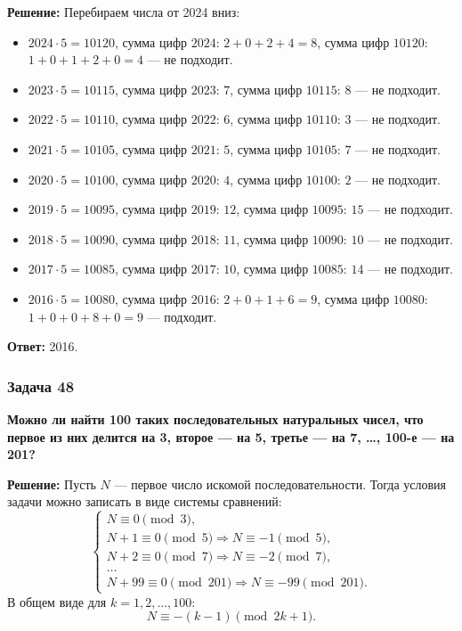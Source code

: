 \documentclass[12pt, a4paper]{article}
\begin{document}
\textbf{Решение:}
Перебираем числа от 2024 вниз:
\begin{itemize}
    \item $2024 \cdot 5 = 10120$, сумма цифр $2024$: $2+0+2+4=8$, сумма цифр $10120$: $1+0+1+2+0=4$ — не подходит.
    \item $2023 \cdot 5 = 10115$, сумма цифр $2023$: $7$, сумма цифр $10115$: $8$ — не подходит.
    \item $2022 \cdot 5 = 10110$, сумма цифр $2022$: $6$, сумма цифр $10110$: $3$ — не подходит.
    \item $2021 \cdot 5 = 10105$, сумма цифр $2021$: $5$, сумма цифр $10105$: $7$ — не подходит.
    \item $2020 \cdot 5 = 10100$, сумма цифр $2020$: $4$, сумма цифр $10100$: $2$ — не подходит.
    \item $2019 \cdot 5 = 10095$, сумма цифр $2019$: $12$, сумма цифр $10095$: $15$ — не подходит.
    \item $2018 \cdot 5 = 10090$, сумма цифр $2018$: $11$, сумма цифр $10090$: $10$ — не подходит.
    \item $2017 \cdot 5 = 10085$, сумма цифр $2017$: $10$, сумма цифр $10085$: $14$ — не подходит.
    \item $2016 \cdot 5 = 10080$, сумма цифр $2016$: $2+0+1+6=9$, сумма цифр $10080$: $1+0+0+8+0=9$ — подходит.
\end{itemize}

\textbf{Ответ:} 2016.

\subsubsection*{Задача 48}
\textbf{Можно ли найти 100 таких последовательных натуральных чисел, что первое из них делится на 3, второе — на 5, третье — на 7, \ldots, 100-е — на 201?}

\textbf{Решение:}
Пусть \(N\) — первое число искомой последовательности. Тогда условия задачи можно записать в виде системы сравнений:
\[
\begin{cases}
N \equiv 0 \pmod 3, \\
N+1 \equiv 0 \pmod 5 \Rightarrow N \equiv -1 \pmod 5, \\
N+2 \equiv 0 \pmod 7 \Rightarrow N \equiv -2 \pmod 7, \\
\dots \\
N+99 \equiv 0 \pmod{201} \Rightarrow N \equiv -99 \pmod{201}.
\end{cases}
\]
В общем виде для \(k = 1, 2, \dots, 100\):
\[
N \equiv -(k-1) \pmod{2k+1}.
\]
\end{document}
